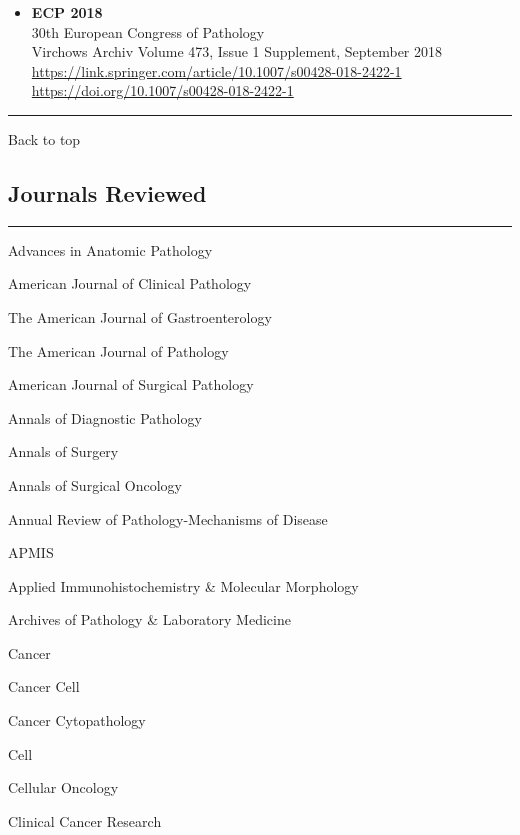 \documentclass[]{article}
\providecommand{\tightlist}{%
  \setlength{\itemsep}{0pt}\setlength{\parskip}{0pt}}
\begin{document}
\begin{itemize}
\tightlist
\item
  \textbf{ECP 2018}\\
  30th European Congress of Pathology\\
  Virchows Archiv Volume 473, Issue 1 Supplement, September 2018\\
  \url{https://link.springer.com/article/10.1007/s00428-018-2422-1}~\\
  \url{https://doi.org/10.1007/s00428-018-2422-1}
\end{itemize}

\begin{center}\rule{0.5\linewidth}{\linethickness}\end{center}

Back to top

\pagebreak

\hypertarget{journals-reviewed}{%
\subsection{Journals Reviewed}\label{journals-reviewed}}

\begin{center}\rule{0.5\linewidth}{\linethickness}\end{center}

Advances in Anatomic Pathology

American Journal of Clinical Pathology

The American Journal of Gastroenterology

The American Journal of Pathology

American Journal of Surgical Pathology

Annals of Diagnostic Pathology

Annals of Surgery

Annals of Surgical Oncology

Annual Review of Pathology-Mechanisms of Disease

APMIS

Applied Immunohistochemistry \& Molecular Morphology

Archives of Pathology \& Laboratory Medicine

Cancer

Cancer Cell

Cancer Cytopathology

Cell

Cellular Oncology

Clinical Cancer Research
\end{document}
